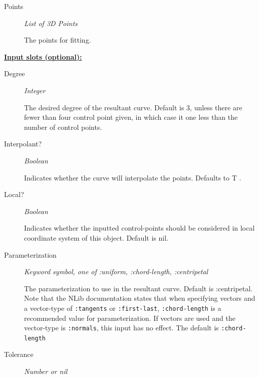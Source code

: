 \documentclass [11pt]{book}
\begin{document}
\begin{itemize}
\begin{description}

\item [Points]
\emph{List of 3D Points}

 The points for fitting.




\end{description}






\textbf{
\underline{Input slots (optional):}}

\begin{description}

\item [Degree]
\emph{Integer}

 The desired degree of the resultant curve. Default is 3, unless there are fewer than four control point given,
in which case it one less than the number of control points.




\item [Interpolant?]
\emph{Boolean}

 Indicates whether the curve will interpolate the points. Defaults to T .




\item [Local?]
\emph{Boolean}

 Indicates whether the inputted control-points should be considered in local coordinate system of this object. Default is nil.




\item [Parameterization]
\emph{Keyword symbol, one of :uniform, :chord-length, :centripetal}

 The parameterization to use in the resultant curve.
Default is :centripetal. Note that the NLib documentation states that when specifying vectors and a vector-type of \texttt{:tangents}
or \texttt{:first-last}, \texttt{:chord-length} is a recommended value for parameterization. If vectors are used and the vector-type
is \texttt{:normals}, this input has no effect. The default is \texttt{:chord-length}




\item [Tolerance]
\emph{Number or nil}


\end{description}
\end{itemize}
\end{document}
